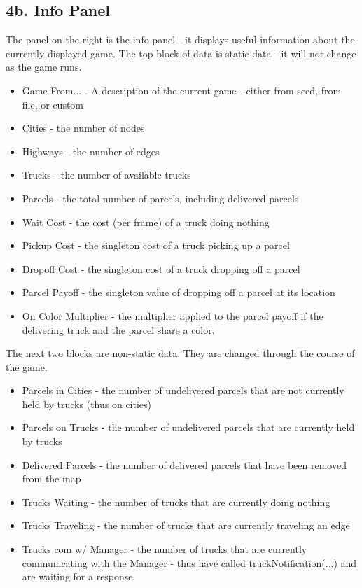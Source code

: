 \documentclass[11pt]{article}
\begin{document}
\subsection{4b. Info Panel}
The panel on the right is the info panel - it displays useful information about
the currently displayed game.  The top block of data is static data - it will
not change as the game runs.
\begin{itemize}
\item Game From... - A description of the current game - either from seed, from
	file, or custom
\item Cities - the number of nodes
\item Highways - the number of edges
\item Trucks - the number of available trucks
\item Parcels - the total number of parcels, including delivered parcels
\item Wait Cost - the cost (per frame) of a truck doing nothing
\item Pickup Cost - the singleton cost of a truck picking up a parcel
\item Dropoff Cost - the singleton cost of a truck dropping off a parcel
\item Parcel Payoff - the singleton value of dropping off a parcel at its
	location
\item On Color Multiplier - the multiplier applied to the parcel payoff if the
	delivering truck and the parcel share a color.
\end{itemize}

The next two blocks are non-static data. They are changed through the course of
the game.
\begin{itemize}
\item Parcels in Cities - the number of undelivered parcels that are not
	currently held by trucks (thus on cities)
\item Parcels on Trucks - the number of undelivered parcels that are currently
	held by trucks
\item Delivered Parcels - the number of delivered parcels that have been removed
	from the map
\item Trucks Waiting - the number of trucks that are currently doing nothing
\item Trucks Traveling - the number of trucks that are currently traveling an
	edge
\item Trucks com w/ Manager - the number of trucks that are currently
	communicating with the Manager - thus have called truckNotification(...) and
	are waiting for a response.
\end{itemize}
\end{document}

